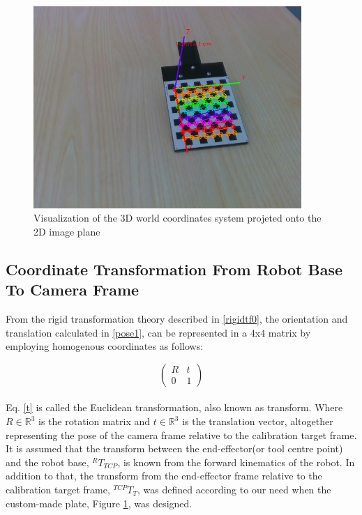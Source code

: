 \begin{figure}[!h]
\begin{center}
\includegraphics[width=4in]{figures03/calibrationtarget1.png}
\caption{Visualization of the 3D world coordinates system projeted onto the 2D image plane}
\label{fig:target3}
\end{center}
\end{figure}



\subsection{Coordinate Transformation From Robot Base To Camera Frame}
From the rigid transformation theory described in \ref{rigidtf0}, the orientation and translation calculated in \ref{pose1}, can be represented in a 4x4 matrix by employing homogenous coordinates as follows:

\begin{equation}
\begin{pmatrix}
R & t \\ \label{t}
0 & 1
\end{pmatrix}
\end{equation}
\\
Eq. \ref{t} is called the Euclidean transformation, also known as transform. Where $R \in \mathbb{R}^{3}$ is the rotation matrix and $t \in \mathbb{R}^{3}$ is the translation vector, altogether representing the pose of the camera frame relative to the calibration target frame.\\
It is assumed that the transform between the end-effector(or tool centre point) and the robot base, $ ^{R}T_{TCP}$, is known from the forward kinematics of the robot. In addition to that, the transform from the end-effector frame relative to the calibration target frame, $ ^{TCP}T_{T}$, was defined according to our need when the custom-made plate, Figure \ref{fig:target3}, was designed.

